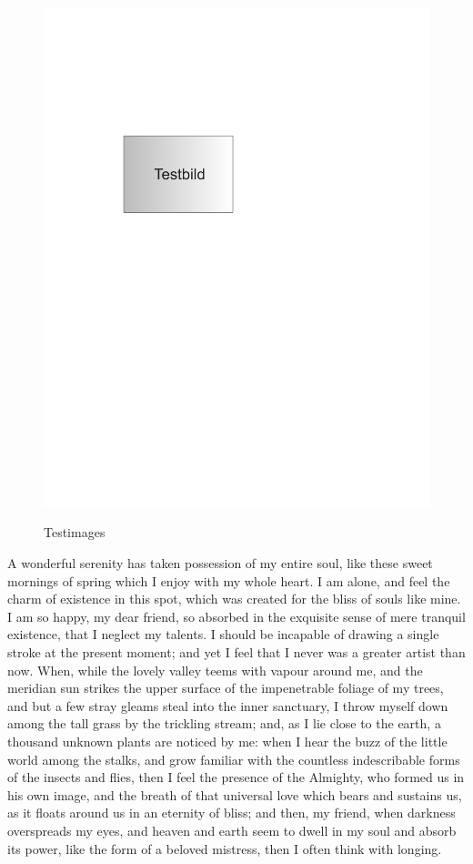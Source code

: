 \begin{figure}[t]
         {\includegraphics[scale=0.8]{images/testimage}\label{fig_testbild_b}
    }
    \caption[Testimages]{Testimages}
        \label{fig_testimage}
    \end{figure}

A wonderful serenity has taken possession of my entire soul, like these sweet mornings of spring which I enjoy with my whole heart. I am alone, and feel the charm of existence in this spot, which was created for the bliss of souls like mine. I am so happy, my dear friend, so absorbed in the exquisite sense of mere tranquil existence, that I neglect my talents. I should be incapable of drawing a single stroke at the present moment; and yet I feel that I never was a greater artist than now. When, while the lovely valley teems with vapour around me, and the meridian sun strikes the upper surface of the impenetrable foliage of my trees, and but a few stray gleams steal into the inner sanctuary, I throw myself down among the tall grass by the trickling stream; and, as I lie close to the earth, a thousand unknown plants are noticed by me: when I hear the buzz of the little world among the stalks, and grow familiar with the countless indescribable forms of the insects and flies, then I feel the presence of the Almighty, who formed us in his own image, and the breath of that universal love which bears and sustains us, as it floats around us in an eternity of bliss; and then, my friend, when darkness overspreads my eyes, and heaven and earth seem to dwell in my soul and absorb its power, like the form of a beloved mistress, then I often think with longing.


